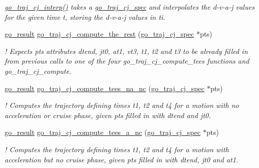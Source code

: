 \begin{DoxyCompactItemize}
\begin{DoxyCompactList}\small\item\em \hyperlink{namespacegomotion_a2d66e2943e92ad2df63ae5d008eb8a6c}{go\-\_\-traj\-\_\-cj\-\_\-interp()} takes a \hyperlink{structgomotion_1_1go__traj__cj__spec}{go\-\_\-traj\-\_\-cj\-\_\-spec} and interpolates the d-\/v-\/a-\/j values for the given time t, storing the d-\/v-\/a-\/j values in ti. \end{DoxyCompactList}\item 
\hyperlink{gotypes_8h_a55d48b38cd959f63c7e8db8337a9792a}{go\-\_\-result} \hyperlink{namespacegomotion_a396781d83275b54de406e65a5c944093}{go\-\_\-traj\-\_\-cj\-\_\-compute\-\_\-the\-\_\-rest} (\hyperlink{structgomotion_1_1go__traj__cj__spec}{go\-\_\-traj\-\_\-cj\-\_\-spec} $\ast$pts)
\begin{DoxyCompactList}\small\item\em ! Expects {\itshape pts} attributes {\itshape dtend}, {\itshape jt0}, {\itshape at1}, {\itshape vt3}, {\itshape t1}, {\itshape t2} and {\itshape t3} to be already filled in from previous calls to one of the four {\itshape go\-\_\-traj\-\_\-cj\-\_\-compute\-\_\-tees} functions and {\itshape go\-\_\-traj\-\_\-cj\-\_\-compute}. \end{DoxyCompactList}\item 
\hyperlink{gotypes_8h_a55d48b38cd959f63c7e8db8337a9792a}{go\-\_\-result} \hyperlink{namespacegomotion_a9cabcec05e99b4da69912b42fcc637e5}{go\-\_\-traj\-\_\-cj\-\_\-compute\-\_\-tees\-\_\-na\-\_\-nc} (\hyperlink{structgomotion_1_1go__traj__cj__spec}{go\-\_\-traj\-\_\-cj\-\_\-spec} $\ast$pts)
\begin{DoxyCompactList}\small\item\em ! Computes the trajectory defining times {\itshape t1}, {\itshape t2} and {\itshape t4} for a motion with no acceleration or cruise phase, given {\itshape pts} filled in with {\itshape dtend} and {\itshape jt0}. \end{DoxyCompactList}\item 
\hyperlink{gotypes_8h_a55d48b38cd959f63c7e8db8337a9792a}{go\-\_\-result} \hyperlink{namespacegomotion_af869a1a311f90bfd85c552a5a5fed4a1}{go\-\_\-traj\-\_\-cj\-\_\-compute\-\_\-tees\-\_\-a\-\_\-nc} (\hyperlink{structgomotion_1_1go__traj__cj__spec}{go\-\_\-traj\-\_\-cj\-\_\-spec} $\ast$pts)
\begin{DoxyCompactList}\small\item\em ! Computes the trajectory defining times {\itshape t1}, {\itshape t2} and {\itshape t4} for a motion with acceleration but no cruise phase, given {\itshape pts} filled in with {\itshape dtend}, {\itshape jt0} and {\itshape at1}. \end{DoxyCompactList}\item 

\end{DoxyCompactItemize}
